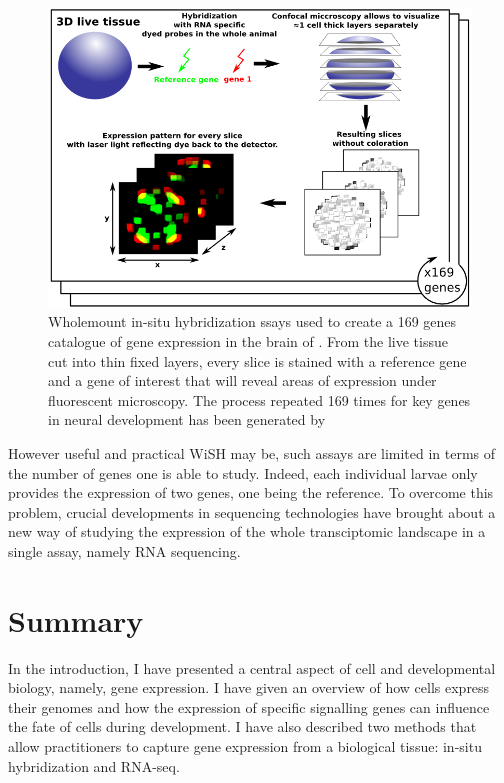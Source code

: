     \begin{figure}[bth]
\centerline{\includegraphics[width=1.3\linewidth]{gfx/chapter1/insitu.png}}
\caption{Wholemount in-situ hybridization ssays used to create a 169 genes catalogue of gene expression in the brain of \platy{}. From the live tissue cut into thin fixed layers, every slice is stained with a reference gene and a gene of interest that will reveal areas of expression under fluorescent microscopy. The process repeated 169 times for key genes in \platy{} neural development has been generated by \citep{Tomer10}}\label{fig:insitu}
	\end{figure}
	
	However useful and practical WiSH may be, such assays are limited in terms of the number of genes one is able to study. Indeed, each individual larvae only provides the expression of two genes, one being the reference. To overcome this problem, crucial developments in sequencing technologies have brought about a new way of studying the expression of the whole transciptomic landscape in a single assay, namely RNA sequencing.


    
\section{Summary}
     
     

	In the introduction, I have presented a central aspect of cell and developmental biology, namely, gene expression. I have given an overview of how cells express their genomes and how the expression of specific signalling genes can influence the fate of cells during development. I have also described two methods that allow practitioners to capture gene expression from a biological tissue: in-situ hybridization and RNA-seq.\\
	
